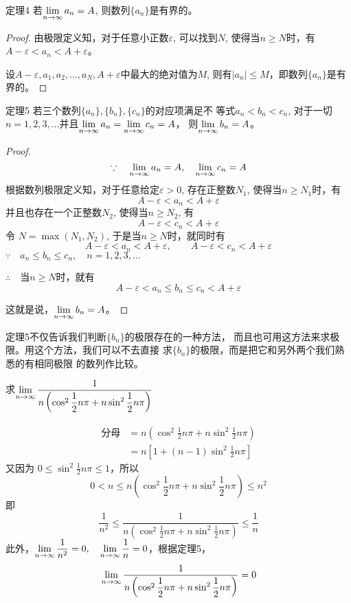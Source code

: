 \begin{blk}{定理4}
    若$\displaystyle\lim_{n\to\infty}a_n=A$, 则数列$\{a_n\}$是有界的。
\end{blk}    

\begin{proof}
由极限定义知，对于任意小正数$\varepsilon$, 可以找到$N$,
使得当$n\ge N$时，有
$A-\varepsilon<a_n<A+\varepsilon$。

设$A-\varepsilon,a_1,a_2,\ldots,a_N,A+\varepsilon$中最大的绝对值为$M$, 
则有$|a_n|\le M$，即数列$\{a_n\}$是有界的。
\end{proof}

\begin{blk}{定理5}
    若三个数列$\{a_n\},\{b_n\},\{c_n\}$的对应项满足不
等式$a_n<b_n<c_n$, 对于一切$n=1,2,3,\ldots$并且$\displaystyle\lim_{n\to\infty}a_n=\displaystyle\lim_{n\to\infty}c_n=A$，
则$\displaystyle\lim_{n\to\infty}b_n=A$。
\end{blk}

\begin{proof}
\[\because\quad \displaystyle\lim_{n\to\infty}a_n=A,\quad \displaystyle\lim_{n\to\infty}c_n=A\]
根据数列极限定义知，对于任意给定$\varepsilon >0$, 存在正整数$N_1$,
使得当$n\ge N_1$时，有
\[A-\varepsilon <a_n<A+\varepsilon\] 
并且也存在一个正整数$N_2$, 使得当$n\ge N_2$, 有
\[A-\varepsilon <c_n<A+\varepsilon\]
令 $N=\max(N_1,N_2)$, 于是当$n\ge N$时，就同时有
\[A-\varepsilon <a_n<A+\varepsilon ,\qquad A-\varepsilon <c_n<A+\varepsilon \]
$\because\quad a_n\le b_n\le c_n,\quad n=1,2,3,\ldots$

$\therefore\quad $当$n\ge N$时，就有
\[A-\varepsilon <a_n\le b_n\le c_n<A+\varepsilon\]

这就是说，$\displaystyle\lim_{n\to\infty}b_n=A$。
\end{proof}

定理5不仅告诉我们判断$\{b_n\}$的极限存在的一种方法，
而且也可用这方法来求极限。用这个方法，我们可以不去直接
求$\{b_n\}$的极限，而是把它和另外两个我们熟悉的有相同极限
的数列作比较。

\begin{example}
    求$\displaystyle\lim_{n\to\infty}\dfrac{1}{n\left(\cos^2\dfrac{1}{2}n\pi+n\sin^2\dfrac{1}{2}n\pi\right)}$
\end{example}

\begin{solution}
\[\begin{split}
    \text{分母}&=n\left(\cos^2\frac{1}{2}n\pi+n\sin^2\frac{1}{2}n\pi\right)\\
    &=n\left[1+(n-1)\sin^2\frac{1}{2}n\pi\right]
\end{split}\]
又因为 $0\le \sin^2\frac{1}{2}n\pi\le 1$，所以
\[0<n\le n\left(\cos^2\frac{1}{2}n\pi+n\sin^2\frac{1}{2}n\pi\right)\le n^2\]
即
\[\frac{1}{n^2}\le \frac{1}{n\left(\cos^2\frac{1}{2}n\pi+n\sin^2\frac{1}{2}n\pi\right)}\le \frac{1}{n}\]
此外，$\displaystyle\lim_{n\to\infty}\dfrac{1}{n^2}=0,\quad \displaystyle\lim_{n\to\infty}\dfrac{1}{n}=0$，根据定理5，
\[\displaystyle\lim_{n\to\infty}\dfrac{1}{n\left(\cos^2\dfrac{1}{2}n\pi+n\sin^2\dfrac{1}{2}n\pi\right)}=0\]
\end{solution}



